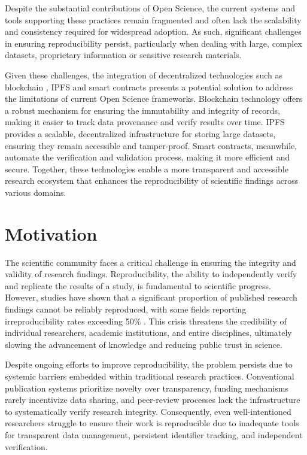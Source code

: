 \documentclass[final]{rc-book-2.14}
\begin{document}
Despite the substantial contributions of Open Science, the current systems and tools supporting these practices remain fragmented and often lack the scalability and consistency required for widespread adoption. As such, significant challenges in ensuring reproducibility persist, particularly when dealing with large, complex datasets, proprietary information  or sensitive research materials.

Given these challenges, the integration of decentralized technologies such as blockchain \cite{nakamoto2012bitcoin}, IPFS \cite{Benet} and smart contracts \cite{Szabo-1994}presents a potential solution to address the limitations of current Open Science frameworks. Blockchain technology offers a robust mechanism for ensuring the immutability and integrity of records, making it easier to track data provenance and verify results over time. IPFS provides a scalable, decentralized infrastructure for storing large datasets, ensuring they remain accessible and tamper-proof. Smart contracts, meanwhile, automate the verification and validation process, making it more efficient and secure. Together, these technologies enable a more transparent and accessible research ecosystem that enhances the reproducibility of scientific findings across various domains.

\section{Motivation}
\label{chp:intro:sec:motivation}

The scientific community faces a critical challenge in ensuring the integrity and validity of research findings. Reproducibility, the ability to independently verify and replicate the results of a study, is fundamental to scientific progress. However, studies have shown that a significant proportion of published research findings cannot be reliably reproduced, with some fields reporting irreproducibility rates exceeding 50\% \cite{baker2016reproducibility}. This crisis threatens the credibility of individual researchers, academic institutions, and entire disciplines, ultimately slowing the advancement of knowledge and reducing public trust in science.

Despite ongoing efforts to improve reproducibility, the problem persists due to systemic barriers embedded within traditional research practices. Conventional publication systems prioritize novelty over transparency, funding mechanisms rarely incentivize data sharing, and peer-review processes lack the infrastructure to systematically verify research integrity. Consequently, even well-intentioned researchers struggle to ensure their work is reproducible due to inadequate tools for transparent data management, persistent identifier tracking, and independent verification.
\end{document}
